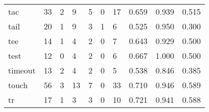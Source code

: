 \begin{longtable}{lp{1.3cm}p{1.3cm}p{1.3cm}p{1.3cm}p{1.3cm}p{1.3cm}p{1.3cm}p{1.3cm}p{1.3cm}}
tac       &                     33 &                                             2 &                                            9 &                                           5 &                                            0 &                                         17 &                                0.659 &                                  0.939 &                                0.515 \\
tail      &                     20 &                                             1 &                                            9 &                                           3 &                                            1 &                                          6 &                                0.525 &                                  0.950 &                                0.300 \\
tee       &                     14 &                                             1 &                                            4 &                                           2 &                                            0 &                                          7 &                                0.643 &                                  0.929 &                                0.500 \\
test      &                     12 &                                             0 &                                            4 &                                           2 &                                            0 &                                          6 &                                0.667 &                                  1.000 &                                0.500 \\
timeout   &                     13 &                                             2 &                                            4 &                                           2 &                                            0 &                                          5 &                                0.538 &                                  0.846 &                                0.385 \\
touch     &                     56 &                                             3 &                                           13 &                                           7 &                                            0 &                                         33 &                                0.710 &                                  0.946 &                                0.589 \\
tr        &                     17 &                                             1 &                                            3 &                                           3 &                                            0 &                                         10 &                                0.721 &                                  0.941 &                                0.588 \\

\end{longtable}
